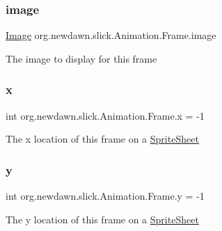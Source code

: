\subsubsection{\texorpdfstring{image}{image}}
{\footnotesize\ttfamily \mbox{\hyperlink{classorg_1_1newdawn_1_1slick_1_1_image}{Image}} org.\+newdawn.\+slick.\+Animation.\+Frame.\+image}

The image to display for this frame \mbox{\label{classorg_1_1newdawn_1_1slick_1_1_animation_1_1_frame_a41c8be82ef72f76b1989dbfe1f593800}} 
\subsubsection{\texorpdfstring{x}{x}}
{\footnotesize\ttfamily int org.\+newdawn.\+slick.\+Animation.\+Frame.\+x = -\/1}

The x location of this frame on a \mbox{\hyperlink{classorg_1_1newdawn_1_1slick_1_1_sprite_sheet}{Sprite\+Sheet}} \mbox{\label{classorg_1_1newdawn_1_1slick_1_1_animation_1_1_frame_ac1201c44d585ba09123c26ced60ff9c9}} 
\subsubsection{\texorpdfstring{y}{y}}
{\footnotesize\ttfamily int org.\+newdawn.\+slick.\+Animation.\+Frame.\+y = -\/1}

The y location of this frame on a \mbox{\hyperlink{classorg_1_1newdawn_1_1slick_1_1_sprite_sheet}{Sprite\+Sheet}} 